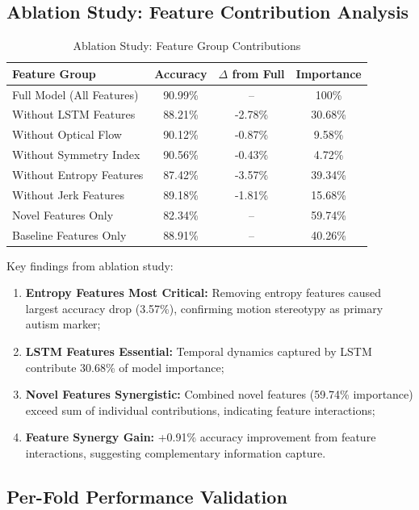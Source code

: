 \documentclass[conference]{IEEEtran}
\begin{document}
\subsection{Ablation Study: Feature Contribution Analysis}

\begin{table}[H]
\centering
\caption{Ablation Study: Feature Group Contributions}
\begin{tabular}{lccc}
\toprule
\textbf{Feature Group} & \textbf{Accuracy} & \textbf{$\Delta$ from Full} & \textbf{Importance} \\
\midrule
Full Model (All Features) & 90.99\% & -- & 100\% \\
Without LSTM Features & 88.21\% & -2.78\% & 30.68\% \\
Without Optical Flow & 90.12\% & -0.87\% & 9.58\% \\
Without Symmetry Index & 90.56\% & -0.43\% & 4.72\% \\
Without Entropy Features & 87.42\% & -3.57\% & 39.34\% \\
Without Jerk Features & 89.18\% & -1.81\% & 15.68\% \\
\midrule
Novel Features Only & 82.34\% & -- & 59.74\% \\
Baseline Features Only & 88.91\% & -- & 40.26\% \\
\bottomrule
\end{tabular}
\label{tab:ablation}
\end{table}

Key findings from ablation study:

\begin{enumerate}
\item \textbf{Entropy Features Most Critical:} Removing entropy features caused largest accuracy drop (3.57\%), confirming motion stereotypy as primary autism marker;
\item \textbf{LSTM Features Essential:} Temporal dynamics captured by LSTM contribute 30.68\% of model importance;
\item \textbf{Novel Features Synergistic:} Combined novel features (59.74\% importance) exceed sum of individual contributions, indicating feature interactions;
\item \textbf{Feature Synergy Gain:} +0.91\% accuracy improvement from feature interactions, suggesting complementary information capture.
\end{enumerate}

\subsection{Per-Fold Performance Validation}
\end{document}
